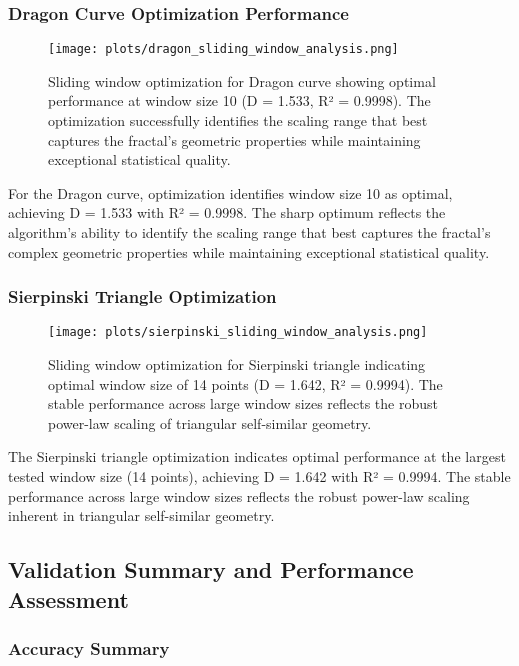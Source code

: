 \documentclass[preprint,12pt]{elsarticle}
\begin{document}
\subsubsection{Dragon Curve Optimization Performance}

\begin{figure}[ht]
\centering
\texttt{[image: plots/dragon\_sliding\_window\_analysis.png]}
\caption{Sliding window optimization for Dragon curve showing optimal performance at window size 10 (D = 1.533, R² = 0.9998). The optimization successfully identifies the scaling range that best captures the fractal's geometric properties while maintaining exceptional statistical quality.}
\label{fig:dragon_optimization}
\end{figure}

For the Dragon curve, optimization identifies window size 10 as optimal, achieving D = 1.533 with R² = 0.9998. The sharp optimum reflects the algorithm's ability to identify the scaling range that best captures the fractal's complex geometric properties while maintaining exceptional statistical quality.

\subsubsection{Sierpinski Triangle Optimization}

\begin{figure}[ht]
\centering
\texttt{[image: plots/sierpinski\_sliding\_window\_analysis.png]}
\caption{Sliding window optimization for Sierpinski triangle indicating optimal window size of 14 points (D = 1.642, R² = 0.9994). The stable performance across large window sizes reflects the robust power-law scaling of triangular self-similar geometry.}
\label{fig:sierpinski_optimization}
\end{figure}

The Sierpinski triangle optimization indicates optimal performance at the largest tested window size (14 points), achieving D = 1.642 with R² = 0.9994. The stable performance across large window sizes reflects the robust power-law scaling inherent in triangular self-similar geometry.

\subsection{Validation Summary and Performance Assessment}

\subsubsection{Accuracy Summary}
\end{document}
